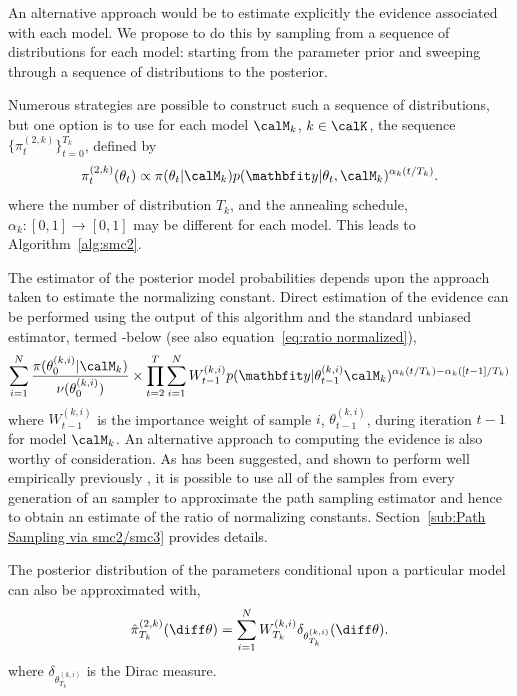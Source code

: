 An alternative approach would be to estimate explicitly the evidence
associated with each model. We propose to do this by sampling from a sequence
of distributions for each model: starting from the parameter prior and
sweeping through a sequence of distributions to the posterior.

Numerous strategies are possible to construct such a sequence of
distributions, but one option is to use for each model $\Mk$, $k\in\calK$, the
sequence $\{\pi_t^{(2,k)}\}_{t=0}^{T_k}$, defined by
\begin{equation}
  \pi_t^{(2,k)}(\paramk[t]) \propto
  \pi(\paramk[t]|\Mk)p(\data|\paramk[t],\Mk)^{\alpha_k(t/T_k)}.
  \label{eq:geometry_2}
\end{equation}
where the number of distribution $T_k$, and the annealing schedule,
$\alpha_k:[0,1]\to[0,1]$ may be different for each model. This leads to
Algorithm~\ref{alg:smc2}.

The estimator of the posterior model probabilities depends upon the approach
taken to estimate the normalizing constant. Direct estimation of the evidence
can be performed using the output of this \smc algorithm and the standard
unbiased estimator, termed \smc[2]-\ds below (see also
equation~\eqref{eq:ratio normalized}),
\begin{equation}\label{eq:smc2-ds}
  \sum_{i=1}^N \frac{\pi(\theta_0^{(k,i)}|\Mk)}{\nu(\theta_0^{(k,i)})} \times
  \prod_{t=2}^T \sum_{i=1}^N W_{t-1}^{(k,i)}
  p(\data|\theta_{t-1}^{(k,i)}\Mk)^{\alpha_k(t/T_k) - \alpha_k([t-1]/T_k)}
\end{equation}
where $W_{t-1}^{(k,i)}$ is the importance weight of sample $i$,
$\theta_{t-1}^{(k,i)}$, during iteration $t-1$ for model $\Mk$. An alternative
approach to computing the evidence is also worthy of consideration. As has
been suggested, and shown to perform well empirically previously \cite[see,
for example]{Johansen:2006wm}, it is possible to use all of the samples from
every generation of an \smc sampler to approximate the path sampling estimator
and hence to obtain an estimate of the ratio of normalizing constants.
Section~\ref{sub:Path Sampling via smc2/smc3} provides details.

The posterior distribution of the parameters conditional upon a particular
model can also be approximated with,
\begin{equation*}
  \hat{\pi}_{T_k}^{(2,k)}(\diff\theta) =
  \sum\limits_{i=1}^{N} W_{T_k}^{(k,i)}
  \delta_{\theta^{(k,i)}_{T_k}}(\diff\theta).
\end{equation*}
where $\delta_{\theta^{(k,i)}_{T_k}}$ is the Dirac measure.

